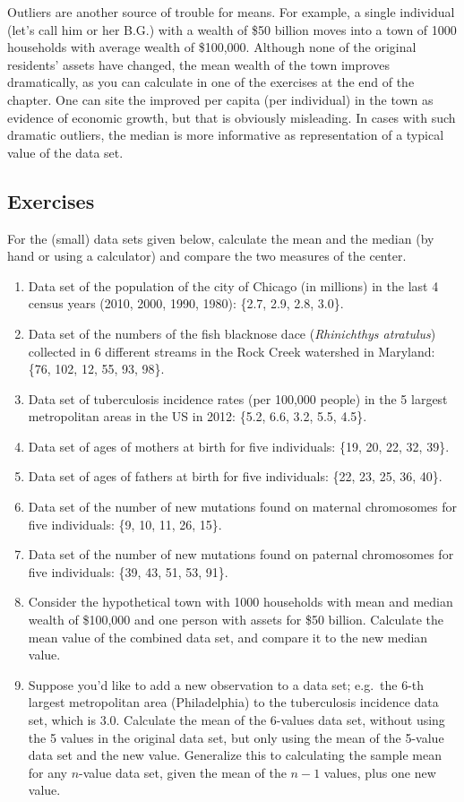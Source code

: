 \documentclass[
  letterpaper,
  DIV=11,
  numbers=noendperiod]{scrreprt}
\begin{document}
Outliers are another source of trouble for means. For example, a single
individual (let's call him or her B.G.) with a wealth of \$50 billion
moves into a town of 1000 households with average wealth of \$100,000.
Although none of the original residents' assets have changed, the mean
wealth of the town improves dramatically, as you can calculate in one of
the exercises at the end of the chapter. One can site the improved per
capita (per individual) in the town as evidence of economic growth, but
that is obviously misleading. In cases with such dramatic outliers, the
median is more informative as representation of a typical value of the
data set.

\hypertarget{exercises-7}{%
\subsection{Exercises}\label{exercises-7}}

For the (small) data sets given below, calculate the mean and the median
(by hand or using a calculator) and compare the two measures of the
center.

\begin{enumerate}
\def\labelenumi{\arabic{enumi}.}
\item
  Data set of the population of the city of Chicago (in millions) in the
  last 4 census years (2010, 2000, 1990, 1980): \{2.7, 2.9, 2.8, 3.0\}.
\item
  Data set of the numbers of the fish blacknose dace (\emph{Rhinichthys
  atratulus}) collected in 6 different streams in the Rock Creek
  watershed in Maryland: \{76, 102, 12, 55, 93, 98\}.
\item
  Data set of tuberculosis incidence rates (per 100,000 people) in the 5
  largest metropolitan areas in the US in 2012: \{5.2, 6.6, 3.2, 5.5,
  4.5\}.
\item
  Data set of ages of mothers at birth for five individuals: \{19, 20,
  22, 32, 39\}.
\item
  Data set of ages of fathers at birth for five individuals: \{22, 23,
  25, 36, 40\}.
\item
  Data set of the number of new mutations found on maternal chromosomes
  for five individuals: \{9, 10, 11, 26, 15\}.
\item
  Data set of the number of new mutations found on paternal chromosomes
  for five individuals: \{39, 43, 51, 53, 91\}.
\item
  Consider the hypothetical town with 1000 households with mean and
  median wealth of \$100,000 and one person with assets for \$50
  billion. Calculate the mean value of the combined data set, and
  compare it to the new median value.
\item
  Suppose you'd like to add a new observation to a data set; e.g.~the
  6-th largest metropolitan area (Philadelphia) to the tuberculosis
  incidence data set, which is 3.0. Calculate the mean of the 6-values
  data set, without using the 5 values in the original data set, but
  only using the mean of the 5-value data set and the new value.
  Generalize this to calculating the sample mean for any \(n\)-value
  data set, given the mean of the \(n-1\) values, plus one new value.
\end{enumerate}
\end{document}
